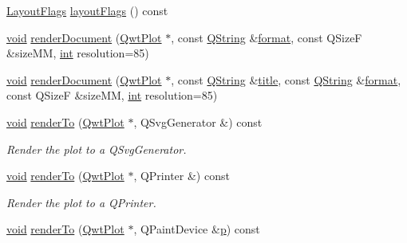 \begin{DoxyCompactItemize}
\item 
\hyperlink{class_qwt_plot_renderer_a20cf36bbea6b03a023d34c25b8b4b295}{Layout\-Flags} \hyperlink{class_qwt_plot_renderer_a0989c9a2b03069418d1f097d14dd1b0b}{layout\-Flags} () const 
\item 
\hyperlink{group___u_a_v_objects_plugin_ga444cf2ff3f0ecbe028adce838d373f5c}{void} \hyperlink{class_qwt_plot_renderer_a8db350801c2c53b0bd9e9884170c7a51}{render\-Document} (\hyperlink{class_qwt_plot}{Qwt\-Plot} $\ast$, const \hyperlink{group___u_a_v_objects_plugin_gab9d252f49c333c94a72f97ce3105a32d}{Q\-String} \&\hyperlink{glext_8h_a86f086d889f7cdb4d6461497ae891265}{format}, const Q\-Size\-F \&size\-M\-M, \hyperlink{ioapi_8h_a787fa3cf048117ba7123753c1e74fcd6}{int} resolution=85)
\item 
\hyperlink{group___u_a_v_objects_plugin_ga444cf2ff3f0ecbe028adce838d373f5c}{void} \hyperlink{class_qwt_plot_renderer_ad9c2863956b05ef16c7b6f424a4a1650}{render\-Document} (\hyperlink{class_qwt_plot}{Qwt\-Plot} $\ast$, const \hyperlink{group___u_a_v_objects_plugin_gab9d252f49c333c94a72f97ce3105a32d}{Q\-String} \&\hyperlink{_parse_e_k_f_log_8m_a5df555a5fed35967e041e4abd1269b4e}{title}, const \hyperlink{group___u_a_v_objects_plugin_gab9d252f49c333c94a72f97ce3105a32d}{Q\-String} \&\hyperlink{glext_8h_a86f086d889f7cdb4d6461497ae891265}{format}, const Q\-Size\-F \&size\-M\-M, \hyperlink{ioapi_8h_a787fa3cf048117ba7123753c1e74fcd6}{int} resolution=85)
\item 
\hyperlink{group___u_a_v_objects_plugin_ga444cf2ff3f0ecbe028adce838d373f5c}{void} \hyperlink{class_qwt_plot_renderer_a60df58b485a25b1048f8ae292bfa345c}{render\-To} (\hyperlink{class_qwt_plot}{Qwt\-Plot} $\ast$, Q\-Svg\-Generator \&) const 
\begin{DoxyCompactList}\small\item\em Render the plot to a Q\-Svg\-Generator. \end{DoxyCompactList}\item 
\hyperlink{group___u_a_v_objects_plugin_ga444cf2ff3f0ecbe028adce838d373f5c}{void} \hyperlink{class_qwt_plot_renderer_afa913f7f77dc04ab9fe0030df79c9806}{render\-To} (\hyperlink{class_qwt_plot}{Qwt\-Plot} $\ast$, Q\-Printer \&) const 
\begin{DoxyCompactList}\small\item\em Render the plot to a Q\-Printer. \end{DoxyCompactList}\item 
\hyperlink{group___u_a_v_objects_plugin_ga444cf2ff3f0ecbe028adce838d373f5c}{void} \hyperlink{class_qwt_plot_renderer_a1501f42510d7f5c144d67baac5d129b5}{render\-To} (\hyperlink{class_qwt_plot}{Qwt\-Plot} $\ast$, Q\-Paint\-Device \&\hyperlink{glext_8h_aa5367c14d90f462230c2611b81b41d23}{p}) const 

\end{DoxyCompactItemize}
